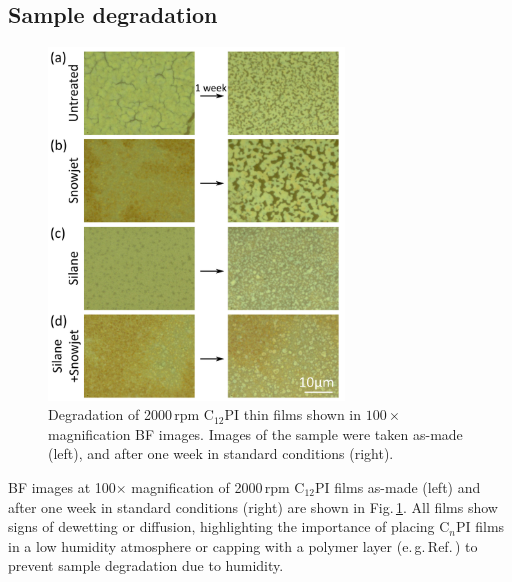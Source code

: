 \subsection{Sample degradation}
\begin{figure}[h!]
\centering
\includegraphics[width=0.7\textwidth]{Fig4}
\caption{Degradation of 2000\,rpm C$_{12}$PI thin films shown in $100\times$ magnification BF images. Images of the sample were taken as-made (left), and after one week in standard conditions (right).}
\label{4Fig4}
\end{figure}
BF images at 100$\times$ magnification of 2000\,rpm C$_{12}$PI films as-made (left) and after one week in standard conditions (right) are shown in Fig.\,\ref{4Fig4}. All films show signs of dewetting or diffusion, highlighting the importance of placing C$_n$PI films in a low humidity atmosphere or capping with a polymer layer (e.\,g.\,Ref.\,\cite{Pradeesh2009}) to prevent sample degradation due to humidity.

